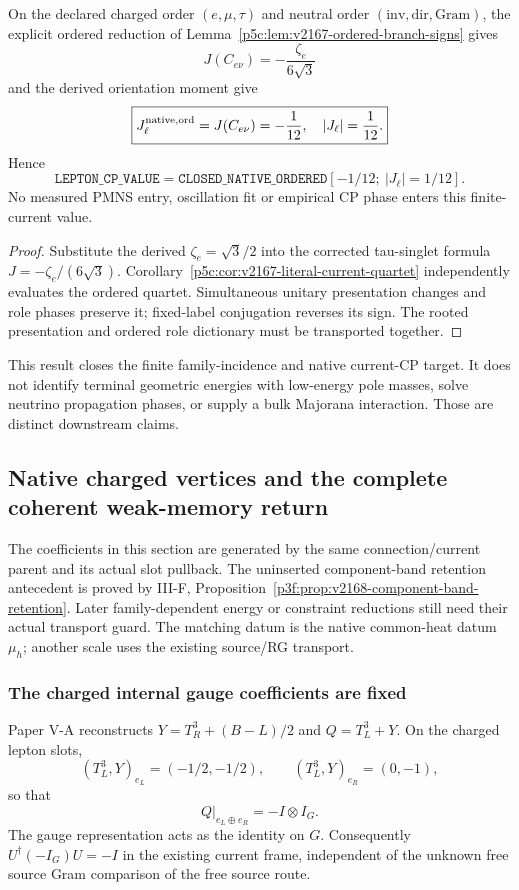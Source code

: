 \documentclass[12pt,a4paper]{article}
\begin{document}
\begin{corollary}
\label{p5c:cor:v277-native-lepton-cp-value}
On the declared charged order $(e,\mu,\tau)$ and neutral order
$(\mathrm{inv},\mathrm{dir},\mathrm{Gram})$, the explicit ordered reduction
of Lemma~\ref{p5c:lem:v2167-ordered-branch-signs} gives
\[
 J(C_{e\nu})=-\frac{\zeta_e}{6\sqrt3}
\]
and the derived orientation moment give
\[
 \boxed{J_\ell^{\rm native,ord}=J(C_{e\nu})=-\frac1{12},\quad |J_\ell|=\frac1{12}.}
\]
Hence
\[
 \boxed{\texttt{LEPTON\_CP\_VALUE}=\texttt{CLOSED\_NATIVE\_ORDERED}[-1/12;\ |J_\ell|=1/12].}
\]
No measured PMNS entry, oscillation fit or empirical CP phase enters this
finite-current value.
\end{corollary}
\begin{proof}
Substitute the derived $\zeta_e=\sqrt3/2$ into the corrected
tau-singlet formula $J=-\zeta_e/(6\sqrt3)$.
Corollary~\ref{p5c:cor:v2167-literal-current-quartet} independently evaluates
the ordered quartet. Simultaneous unitary presentation changes and role
phases preserve it; fixed-label conjugation reverses its sign. The
rooted presentation and ordered role dictionary must be transported together.
\end{proof}

\begin{remark}
This result closes the finite family-incidence and native current-CP target.
It does not identify terminal geometric energies with low-energy pole masses,
solve neutrino propagation phases, or supply a bulk Majorana interaction.
Those are distinct downstream claims.
\end{remark}

\subsection{Native charged vertices and the complete coherent weak-memory return}
\label{p5c:sec:v2168-native-weak-memory}
The coefficients in this section are generated by the same
connection/current parent and its actual slot pullback. The uninserted
component-band retention antecedent is proved by III-F,
Proposition~\ref{p3f:prop:v2168-component-band-retention}. Later family-dependent
energy or constraint reductions still need their actual transport guard.
The matching datum is the native common-heat datum $\mu_h$; another scale
uses the existing source/RG transport.
\subsubsection{The charged internal gauge coefficients are fixed}
Paper V-A reconstructs $Y=T_R^3+(B-L)/2$ and
$Q=T_L^3+Y$. On the charged lepton slots,
\[
 (T_L^3,Y)_{e_L}=(-1/2,-1/2),\qquad
 (T_L^3,Y)_{e_R}=(0,-1),
\]
so that
\[
 \boxed{Q|_{e_L\oplus e_R}=-I\otimes I_G.}
\]
The gauge representation acts as the identity on $G$. Consequently
$U^\dagger(-I_G)U=-I$ in the existing current frame, independent of the
unknown free source Gram comparison of the free source route.
\end{document}
